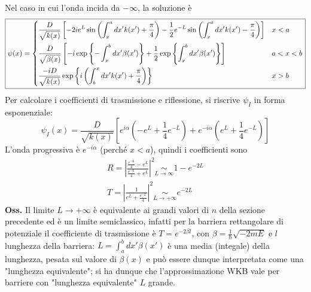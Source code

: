 Nel caso in cui l'onda incida da $-\infty$, la soluzione è
$$\boxed{
\psi(x) =
\begin{dcases}
  \frac{D}{\sqrt{k(x)}}\left[-2ie^L\sin\left(\int_{x}^{a}dx'k(x')+\frac{\pi}{4}\right) - 
  \frac12 e^{-L}\sin\left(\int_{x}^{a}dx'k(x') -\frac{\pi}{4}\right)\right]&x<a\\
  \frac{D}{\sqrt{\beta(x)}} \left[-i\exp\left\{-\int_{x}^{b}dx'\beta(x')\right\}+
\frac12 \exp\left\{\int_{x}^{b}dx'\beta(x')\right\}\right]&a<x<b\\
\frac{-iD}{\sqrt{k(x)}} \exp\left\{i\left(\int_{b}^{x}dx'k(x')+\frac{\pi}{4}\right)\right\}&x>b
\end{dcases}}$$
Per calcolare i coefficienti di trasmissione e riflessione, si riscrive $\psi_I$ in forma
esponenziale:
$$\psi_I(x) = \frac{D}{\sqrt{k(x)}}\left[e^{i\alpha}\left(-e^L+\frac{1}{4}e^{-L}\right)+
e^{-i\alpha}\left(e^L+\frac{1}{4}e^{-L}\right)\right]$$
L'onda progressiva è $e^{-i\alpha}$ (perché $x<a$), quindi i coefficienti sono
\begin{gather*}
R=\left|\frac{\frac{e^{-L}}{4}-e^L}{\frac{e^{-L}}{4}+e^L}\right|^2\underset{L\to\infty}\sim
1-e^{-2L}\\
T=\left|\frac{1}{e^L+\frac{e^{-L}}{4}}\right|^2\underset{L\to+\infty}\sim e^{-2L}
\end{gather*}
\textbf{Oss.} Il limite $L\to+\infty$ è equivalente ai grandi valori di $n$ della sezione
precedente ed è un limite semiclassico, infatti per la barriera rettangolare di potenziale il
coefficiente di trasmissione è $T=e^{-2\beta l}$, con $\beta = \frac{1}{\hbar}\sqrt{-2mE}$ e $l$
lunghezza della barriera: $L=\int_{a}^{b}dx'\beta(x')$ è una media (integale) della lunghezza, pesata
sul valore di $\beta(x)$ e può essere dunque interpretata come una "lunghezza equivalente"; si ha
dunque che l'approssimazione WKB vale per barriere con "lunghezza equivalente" $L$ grande.
